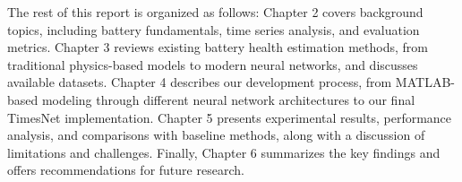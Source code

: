 The rest of this report is organized as follows: Chapter 2 covers background topics, including battery fundamentals, time series analysis, and evaluation metrics. Chapter 3 reviews existing battery health estimation methods, from traditional physics-based models to modern neural networks, and discusses available datasets. Chapter 4 describes our development process, from MATLAB-based modeling through different neural network architectures to our final TimesNet implementation. Chapter 5 presents experimental results, performance analysis, and comparisons with baseline methods, along with a discussion of limitations and challenges. Finally, Chapter 6 summarizes the key findings and offers recommendations for future research.

